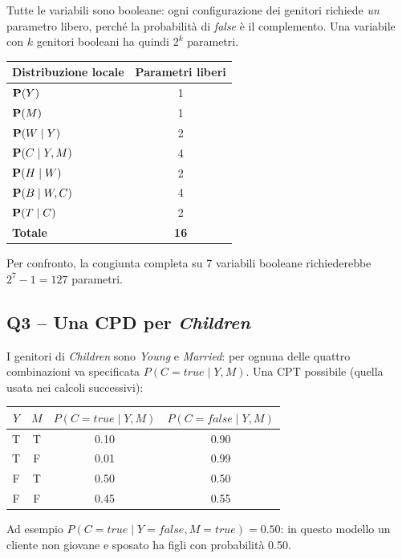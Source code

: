 Tutte le variabili sono booleane: ogni configurazione dei genitori richiede
\emph{un} parametro libero, perché la probabilità di \textit{false} è il
complemento. Una variabile con $k$ genitori booleani ha quindi $2^k$
parametri.
\begin{center}
\begin{tabular}{lc}
  \toprule
  Distribuzione locale & Parametri liberi \\ \midrule
  $\mathbf{P}(Y)$ & 1 \\ $\mathbf{P}(M)$ & 1 \\ $\mathbf{P}(W\mid Y)$ & 2 \\ $\mathbf{P}(C\mid Y,M)$ & 4 \\
  $\mathbf{P}(H\mid W)$ & 2 \\ $\mathbf{P}(B\mid W,C)$ & 4 \\ $\mathbf{P}(T\mid C)$ & 2 \\ \midrule
  \textbf{Totale} & \textbf{16} \\ \bottomrule
\end{tabular}
\end{center}
Per confronto, la congiunta completa su 7 variabili booleane richiederebbe
$2^7-1=127$ parametri.

\subsection*{Q3 -- Una CPD per \textit{Children}}

I genitori di \textit{Children} sono \textit{Young} e \textit{Married}: per
ognuna delle quattro combinazioni va specificata $P(C=\mathit{true}\mid Y,M)$.
Una CPT possibile (quella usata nei calcoli successivi):
\begin{center}
\begin{tabular}{cc|cc}
  $Y$ & $M$ & $P(C=\mathit{true}\mid Y,M)$ & $P(C=\mathit{false}\mid Y,M)$ \\ \midrule
  T & T & 0.10 & 0.90 \\
  T & F & 0.01 & 0.99 \\
  F & T & 0.50 & 0.50 \\
  F & F & 0.45 & 0.55
\end{tabular}
\end{center}
Ad esempio $P(C=\mathit{true}\mid Y=\mathit{false},M=\mathit{true})=0.50$: in questo
modello un cliente non giovane e sposato ha figli con probabilità 0.50.


